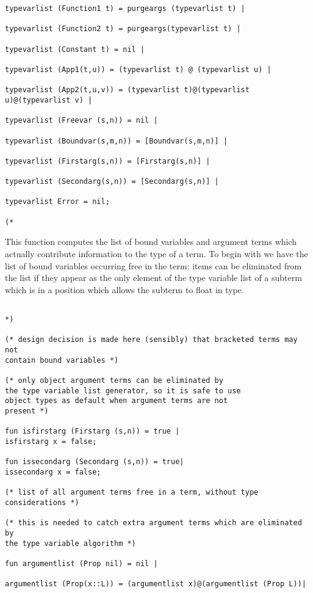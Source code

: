 \documentclass{article}
\begin{document}
{{\begin{verbatim}
typevarlist (Function1 t) = purgeargs (typevarlist t) |

typevarlist (Function2 t) = purgeargs(typevarlist t) |

typevarlist (Constant t) = nil |

typevarlist (App1(t,u)) = (typevarlist t) @ (typevarlist u) |

typevarlist (App2(t,u,v)) = (typevarlist t)@(typevarlist u)@(typevarlist v) |

typevarlist (Freevar (s,n)) = nil |

typevarlist (Boundvar(s,m,n)) = [Boundvar(s,m,n)] |

typevarlist (Firstarg(s,n)) = [Firstarg(s,n)] |

typevarlist (Secondarg(s,n)) = [Secondarg(s,n)] |

typevarlist Error = nil;

(*

\end{verbatim}

This function computes the list of bound variables and argument terms which actually contribute information to the type of a term.
To begin with we have the list of bound variables occurring free in the term:
items can be eliminated from the list if they appear as the only element of the type variable list of a subterm which is in a position which allows
the subterm to float in type. 

\begin{verbatim}

*)

(* design decision is made here (sensibly) that bracketed terms may not
contain bound variables *)

(* only object argument terms can be eliminated by
the type variable list generator, so it is safe to use
object types as default when argument terms are not
present *)

fun isfirstarg (Firstarg (s,n)) = true |
isfirstarg x = false;

fun issecondarg (Secondarg (s,n)) = true|
issecondarg x = false;

(* list of all argument terms free in a term, without type considerations *)

(* this is needed to catch extra argument terms which are eliminated by
the type variable algorithm *)

fun argumentlist (Prop nil) = nil |

argumentlist (Prop(x::L)) = (argumentlist x)@(argumentlist (Prop L))|


\end{verbatim}}}
\end{document}
